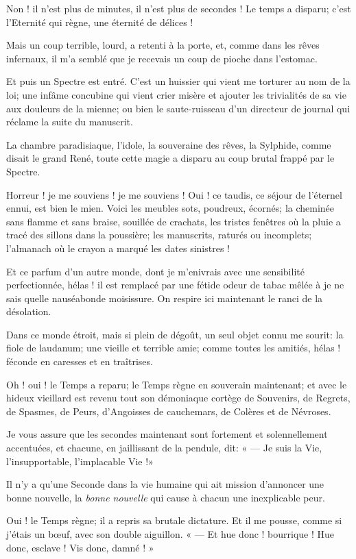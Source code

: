 Non ! il n’est plus de minutes, il
n’est plus de secondes ! Le temps a disparu;
c’est l’Eternité qui règne, une
éternité de délices !

Mais un coup terrible, lourd, a retenti à la porte, et, comme dans les
rêves infernaux, il m’a semblé que je recevais un coup
de pioche dans l’estomac.

Et puis un Spectre est entré. C’est un huissier qui
vient me torturer au nom de la loi; une infâme concubine qui vient
crier misère et ajouter les trivialités de sa vie aux douleurs de la
mienne; ou bien le saute{}-ruisseau d’un directeur de
journal qui réclame la suite du manuscrit.

La chambre paradisiaque, l’idole, la souveraine des
rêves, la Sylphide, comme disait le grand René, toute cette magie a
disparu au coup brutal frappé par le Spectre.

Horreur ! je me souviens ! je me souviens ! Oui ! ce taudis, ce séjour
de l’éternel ennui, est bien le mien. Voici les
meubles sots, poudreux, écornés; la cheminée sans flamme et sans
braise, souillée de crachats, les tristes fenêtres où la pluie a tracé
des sillons dans la poussière; les manuscrits, raturés ou incomplets;
l’almanach où le crayon a marqué les dates sinistres !

Et ce parfum d’un autre monde, dont je
m’enivrais avec une sensibilité perfectionnée, hélas !
il est remplacé par une fétide odeur de tabac mêlée à je ne sais quelle
nauséabonde moisissure. On respire ici maintenant le ranci de la
désolation.

Dans ce monde étroit, mais si plein de dégoût, un seul objet connu me
sourit: la fiole de laudanum; une vieille et terrible amie; comme
toutes les amitiés, hélas ! féconde en caresses et en traîtrises.

Oh ! oui ! le Temps a reparu; le Temps règne en souverain maintenant; et
avec le hideux vieillard est revenu tout son démoniaque cortège de
Souvenirs, de Regrets, de Spasmes, de Peurs,
d’Angoisses de cauchemars, de Colères et de Névroses.

Je vous assure que les secondes maintenant sont fortement et
solennellement accentuées, et chacune, en jaillissant de la pendule,
dit: « --- Je suis la Vie, l’insupportable,
l’implacable Vie !»

Il n’y a qu’une Seconde dans la vie
humaine qui ait mission d’annoncer une bonne nouvelle,
la \textit{bonne nouvelle} qui cause à chacun une inexplicable peur.

Oui ! le Temps règne; il a repris sa brutale dictature. Et il me pousse, 
comme si j’étais un b\oe uf, avec son double aiguillon. 
« --- Et hue donc ! bourrique ! Hue donc, esclave ! Vis donc, damné ! » 


